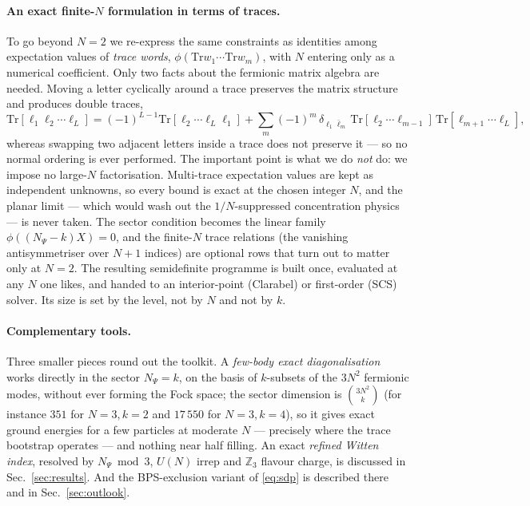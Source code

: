 \documentclass[10pt]{article}
\newcommand{\Tr}{\mathrm{Tr}}
\begin{document}
\paragraph{An exact finite-$N$ formulation in terms of traces.}
To go beyond $N=2$ we re-express the same constraints as identities among expectation values of \emph{trace words}, $\phi(\Tr w_1\cdots\Tr w_m)$, with $N$ entering only as a numerical coefficient. Only two facts about the fermionic matrix algebra are needed. Moving a letter cyclically around a trace preserves the matrix structure and produces double traces,
\begin{equation}
\Tr[\ell_1\ell_2\cdots\ell_L]=(-1)^{L-1}\Tr[\ell_2\cdots\ell_L\ell_1]+\sum_{m}(-1)^m\,\delta_{\ell_1\bar\ell_m}\,\Tr[\ell_2\cdots\ell_{m-1}]\,\Tr[\ell_{m+1}\cdots\ell_L],
\end{equation}
whereas swapping two adjacent letters inside a trace does not preserve it --- so no normal ordering is ever performed. The important point is what we do \emph{not} do: we impose no large-$N$ factorisation. Multi-trace expectation values are kept as independent unknowns, so every bound is exact at the chosen integer $N$, and the planar limit --- which would wash out the $1/N$-suppressed concentration physics --- is never taken. The sector condition becomes the linear family $\phi((N_\Psi-k)X)=0$, and the finite-$N$ trace relations (the vanishing antisymmetriser over $N+1$ indices) are optional rows that turn out to matter only at $N=2$. The resulting semidefinite programme is built once, evaluated at any $N$ one likes, and handed to an interior-point (Clarabel) or first-order (SCS) solver. Its size is set by the level, not by $N$ and not by $k$.

\paragraph{Complementary tools.}
Three smaller pieces round out the toolkit. A \emph{few-body exact diagonalisation} works directly in the sector $N_\Psi=k$, on the basis of $k$-subsets of the $3N^2$ fermionic modes, without ever forming the Fock space; the sector dimension is $\binom{3N^2}{k}$ (for instance $351$ for $N=3,k=2$ and $17\,550$ for $N=3,k=4$), so it gives exact ground energies for a few particles at moderate $N$ --- precisely where the trace bootstrap operates --- and nothing near half filling. An exact \emph{refined Witten index}, resolved by $N_\Psi \bmod 3$, $U(N)$ irrep and $\mathbb Z_3$ flavour charge, is discussed in Sec.~\ref{sec:results}. And the BPS-exclusion variant of \eqref{eq:sdp} is described there and in Sec.~\ref{sec:outlook}.
\end{document}
